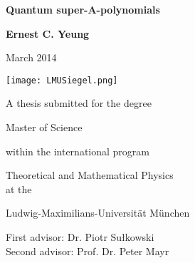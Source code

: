 \documentclass[a4paper,titlepage,twoside]{book}
\begin{document}


\vspace*{0,5 cm}
\thispagestyle{empty}

\begin{center}
\LARGE{\textbf{Quantum super-A-polynomials}}\\
\vspace{0,5 cm}
\end{center}

\begin{center}
\large{\textbf{Ernest C. Yeung}}
\end{center}
\begin{center}
\large{March 2014}
\end{center}
\vspace*{0,25 cm}
\begin{center}
\texttt{[image: LMUSiegel.png]}
\end{center}
\vspace*{0,25 cm}
\begin{center}
           A thesis submitted for the degree\\\vspace{0,25 cm}

     Master of Science\\\vspace{0,25 cm}

within the international program\\    \vspace{0,25 cm}
                            
             Theoretical and Mathematical Physics\\ \vspace{0,25 cm}
at the \\    \vspace{0,25 cm}

Ludwig-Maximilians-Universit\"{a}t M\"{u}nchen               

\end{center}
\vspace*{1cm}


\begin{center}
First advisor: Dr. Piotr Su\l kowski \\
Second advisor: Prof. Dr. Peter Mayr
\end{center}
\end{document}
